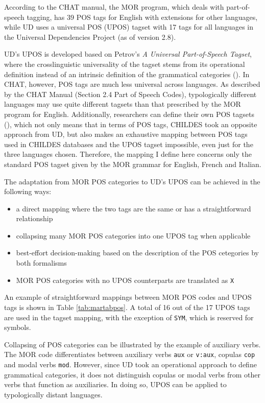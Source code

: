 According to the CHAT manual, the MOR program, which deals with part-of-speech tagging, has 39 POS tags for English with extensions for other languages, while UD uses a universal POS (UPOS) tagset with 17 tags for all languages in the Universal Dependencies Project (as of version 2.8).

UD's UPOS is developed based on Petrov's \emph{A Universal Part-of-Speech Tagset}, where the crosslinguistic universality of the tagset stems from its operational definition instead of an intrinsic definition of the grammatical categories (\cite{petrov2012}). In CHAT, however, POS tags are much less universal across languages. As described by the CHAT Manual (Section 2.4 Part of Speech Codes), typologically different languages may use quite different tagsets than that prescribed by the MOR program for English. Additionally, researchers can define their own POS tagsets (\cite{Macwhinney2000}), which not only means that in terms of POS tags, CHILDES took an opposite approach from UD, but also makes an exhaustive mapping between POS tags used in CHILDES databases and the UPOS tagset impossible, even just for the three languages chosen. Therefore, the mapping I define here concerns only the standard POS tagset given by the MOR grammar for English, French and Italian.

The adaptation from MOR POS categories to UD's UPOS can be achieved in the following ways:
\begin{itemize}
    \item a direct mapping where the two tags are the same or has a straightforward relationship
    \item collapsing many MOR POS categories into one UPOS tag when applicable
    \item best-effort decision-making based on the description of the POS cetegories by both formalisms
    \item MOR POS categories with no UPOS counterparts are translated as \texttt{X}
\end{itemize}

An example of straightforward mappings between MOR POS codes and UPOS tags is shown in Table \ref{tab:martabpos}. A total of 16 out of the 17 UPOS tags are used in the tagset mapping, with the exception of \texttt{SYM}, which is reserved for symbols.

Collapsing of POS categories can be illustrated by the example of auxiliary verbs. The MOR code differentiates between auxiliary verbs \texttt{aux} or \texttt{v:aux}, copulas \texttt{cop} and modal verbs \texttt{mod}. However, since UD took an operational approach to define grammatical categories, it does not distinguish copulas or modal verbs from other verbs that function as auxiliaries.  In doing so, UPOS can be applied to typologically distant languages.

